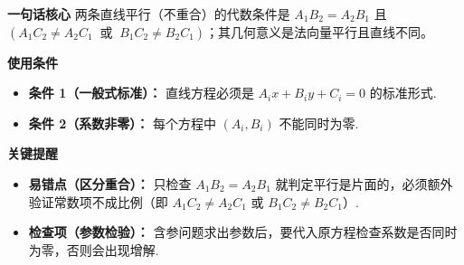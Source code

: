 \begin{summarybox}
	\textbf{\textcolor{CSummary}{一句话核心}}
	两条直线平行（不重合）的代数条件是 $A_1B_2=A_2B_1$ 且 $(A_1C_2\neq A_2C_1\ \text{ 或 }\ B_1C_2\neq B_2C_1)$；其几何意义是法向量平行且直线不同。

	\medskip
	\textbf{\textcolor{CSummary}{使用条件}}
	\begin{itemize}[leftmargin=*, itemsep=0.5em, topsep=0.4em]
		\item \textbf{条件 1（一般式标准）：} 直线方程必须是 $A_i x + B_i y + C_i = 0$ 的标准形式.
		\item \textbf{条件 2（系数非零）：} 每个方程中 $(A_i,B_i)$ 不能同时为零.
	\end{itemize}

	\medskip
	\textbf{\textcolor{CSummary}{关键提醒}}
	\begin{itemize}[leftmargin=*, itemsep=0.5em, topsep=0.4em]
		\item \textbf{易错点（区分重合）：} 只检查 $A_1B_2 = A_2B_1$ 就判定平行是片面的，必须额外验证常数项不成比例（即 $A_1C_2\neq A_2C_1$ 或 $B_1C_2\neq B_2C_1$）.
		\item \textbf{检查项（参数检验）：} 含参问题求出参数后，要代入原方程检查系数是否同时为零，否则会出现增解.
	\end{itemize}

\end{summarybox}
